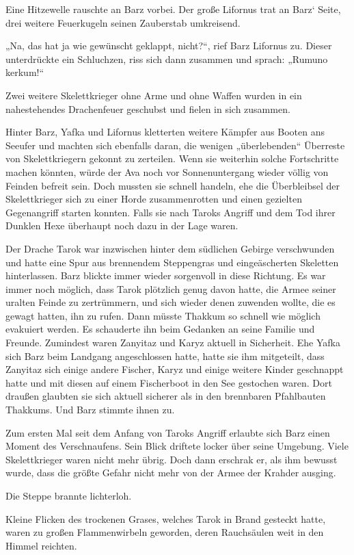 Eine Hitzewelle rauschte an Barz vorbei. Der große Lifornus trat an Barz‘ Seite, drei weitere Feuerkugeln seinen Zauberstab umkreisend.

„Na, das hat ja wie gewünscht geklappt, nicht?“, rief Barz Lifornus zu. Dieser unterdrückte ein Schluchzen, riss sich dann zusammen und sprach: „Rumuno kerkum!“

Zwei weitere Skelettkrieger ohne Arme und ohne Waffen wurden in ein nahestehendes Drachenfeuer geschubst und fielen in sich zusammen.

Hinter Barz, Yafka und Lifornus kletterten weitere Kämpfer aus Booten ans Seeufer und machten sich ebenfalls daran, die wenigen „überlebenden“ Überreste von Skelettkriegern gekonnt zu zerteilen. Wenn sie weiterhin solche Fortschritte machen könnten, würde der Ava noch vor Sonnenuntergang wieder völlig von Feinden befreit sein. Doch mussten sie schnell handeln, ehe die Überbleibsel der Skelettkrieger sich zu einer Horde zusammenrotten und einen gezielten Gegenangriff starten konnten. Falls sie nach Taroks Angriff und dem Tod ihrer Dunklen Hexe überhaupt noch dazu in der Lage waren.

Der Drache Tarok war inzwischen hinter dem südlichen Gebirge verschwunden und hatte eine Spur aus brennendem Steppengras und eingeäscherten Skeletten hinterlassen. Barz blickte immer wieder sorgenvoll in diese Richtung. Es war immer noch möglich, dass Tarok plötzlich genug davon hatte, die Armee seiner uralten Feinde zu zertrümmern, und sich wieder denen zuwenden wollte, die es gewagt hatten, ihn zu rufen. Dann müsste Thakkum so schnell wie möglich evakuiert werden. Es schauderte ihn beim Gedanken an seine Familie und Freunde. Zumindest waren Zanyitaz und Karyz aktuell in Sicherheit. Ehe Yafka sich Barz beim Landgang angeschlossen hatte, hatte sie ihm mitgeteilt, dass Zanyitaz sich einige andere Fischer, Karyz und einige weitere Kinder geschnappt hatte und mit diesen auf einem Fischerboot in den See gestochen waren. Dort draußen glaubten sie sich aktuell sicherer als in den brennbaren Pfahlbauten Thakkums. Und Barz stimmte ihnen zu.

Zum ersten Mal seit dem Anfang von Taroks Angriff erlaubte sich Barz einen Moment des Verschnaufens. Sein Blick driftete locker über seine Umgebung. Viele Skelettkrieger waren nicht mehr übrig. Doch dann erschrak er, als ihm bewusst wurde, dass die größte Gefahr nicht mehr von der Armee der Krahder ausging.

Die Steppe brannte lichterloh.

Kleine Flicken des trockenen Grases, welches Tarok in Brand gesteckt hatte, waren zu großen Flammenwirbeln geworden, deren Rauchsäulen weit in den Himmel reichten.

